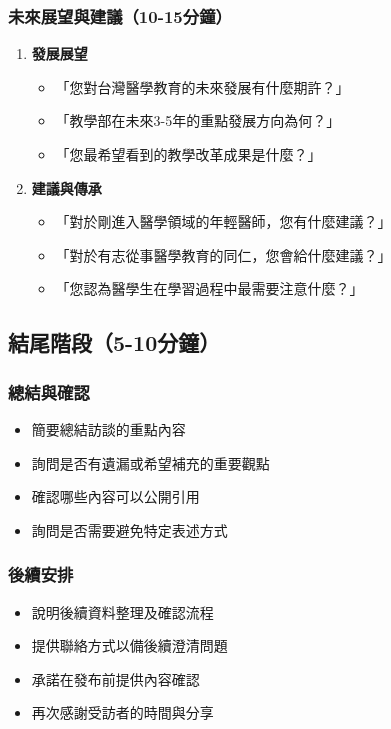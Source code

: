 \documentclass[12pt,a4paper]{article}
\begin{document}
\subsubsection{未來展望與建議（10-15分鐘）}
\begin{enumerate}[nosep]
    \item \textbf{發展展望}
    \begin{itemize}[nosep]
        \item 「您對台灣醫學教育的未來發展有什麼期許？」
        \item 「教學部在未來3-5年的重點發展方向為何？」
        \item 「您最希望看到的教學改革成果是什麼？」
    \end{itemize}

    \item \textbf{建議與傳承}
    \begin{itemize}[nosep]
        \item 「對於剛進入醫學領域的年輕醫師，您有什麼建議？」
        \item 「對於有志從事醫學教育的同仁，您會給什麼建議？」
        \item 「您認為醫學生在學習過程中最需要注意什麼？」
    \end{itemize}
\end{enumerate}


\subsection{結尾階段（5-10分鐘）}
\subsubsection{總結與確認}
\begin{itemize}[nosep]
    \item 簡要總結訪談的重點內容
    \item 詢問是否有遺漏或希望補充的重要觀點
    \item 確認哪些內容可以公開引用
    \item 詢問是否需要避免特定表述方式
\end{itemize}

\subsubsection{後續安排}
\begin{itemize}[nosep]
    \item 說明後續資料整理及確認流程
    \item 提供聯絡方式以備後續澄清問題
    \item 承諾在發布前提供內容確認
    \item 再次感謝受訪者的時間與分享
\end{itemize}
\end{document}
